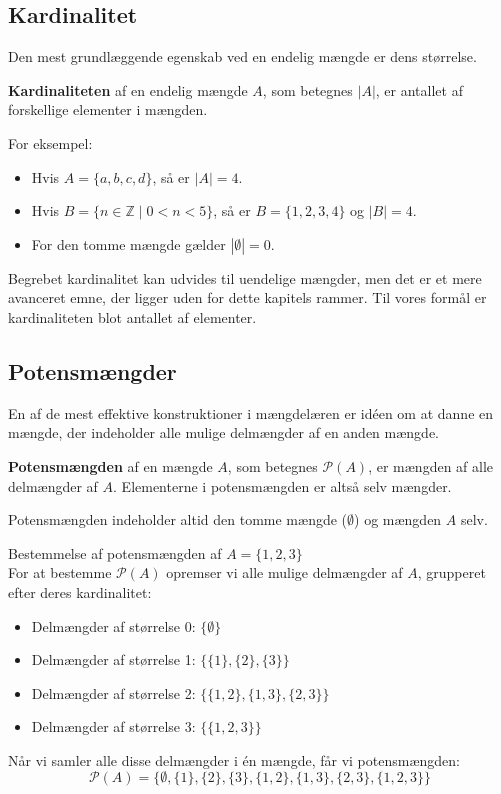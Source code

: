 \subsection*{Kardinalitet}
Den mest grundlæggende egenskab ved en endelig mængde er dens størrelse.

\begin{definition}[Kardinalitet]
    \textbf{Kardinaliteten} af en endelig mængde $A$, som betegnes $|A|$, er antallet af forskellige elementer i mængden.
\end{definition}

For eksempel:
\begin{itemize}
    \item Hvis $A = \{a, b, c, d\}$, så er $|A| = 4$.
    \item Hvis $B = \{ n \in \mathbb{Z} \mid 0 < n < 5 \}$, så er $B = \{1, 2, 3, 4\}$ og $|B| = 4$.
    \item For den tomme mængde gælder $|\emptyset| = 0$.
\end{itemize}

Begrebet kardinalitet kan udvides til uendelige mængder, men det er et mere avanceret emne, der ligger uden for dette kapitels rammer. Til vores formål er kardinaliteten blot antallet af elementer.

\subsection*{Potensmængder}
En af de mest effektive konstruktioner i mængdelæren er idéen om at danne en mængde, der indeholder alle mulige delmængder af en anden mængde.

\begin{definition}[Potensmængde]
    \textbf{Potensmængden} af en mængde $A$, som betegnes $\mathcal{P}(A)$, er mængden af alle delmængder af $A$. Elementerne i potensmængden er altså selv mængder.
\end{definition}

Potensmængden indeholder altid den tomme mængde ($\emptyset$) og mængden $A$ selv.

\begin{example}{Bestemmelse af potensmængden af $A = \{1, 2, 3\}$}\\
    For at bestemme $\mathcal{P}(A)$ opremser vi alle mulige delmængder af $A$, grupperet efter deres kardinalitet:
    \begin{itemize}
        \item Delmængder af størrelse 0: $\{ \emptyset \}$
        \item Delmængder af størrelse 1: $\{ \{1\}, \{2\}, \{3\} \}$
        \item Delmængder af størrelse 2: $\{ \{1, 2\}, \{1, 3\}, \{2, 3\} \}$
        \item Delmængder af størrelse 3: $\{ \{1, 2, 3\} \}$
    \end{itemize}
    
    Når vi samler alle disse delmængder i én mængde, får vi potensmængden:
    \[ \mathcal{P}(A) = \{ \emptyset, \{1\}, \{2\}, \{3\}, \{1, 2\}, \{1, 3\}, \{2, 3\}, \{1, 2, 3\} \} \]
\end{example}

